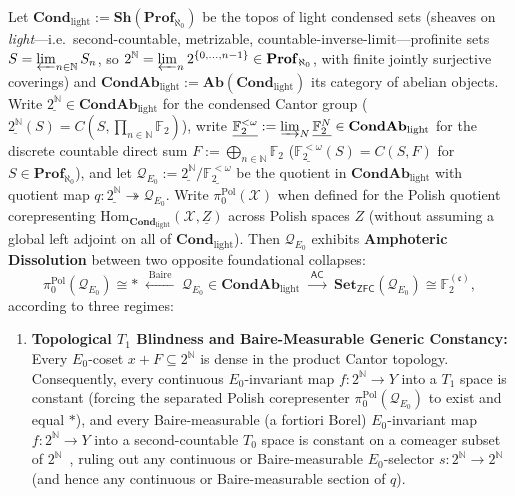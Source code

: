 \begin{theorem}\label{thm:double-solvent-r4}
%
%

Let $\mathbf{Cond}_{\mathrm{light}} := \mathbf{Sh}(\mathbf{Prof}_{\aleph_0})$ be the topos of light condensed sets (sheaves on \emph{light}---i.e.\ second-countable, metrizable, countable-inverse-limit---profinite sets $S = \varprojlim_{n \in \mathbb{N}} S_n$, so $2^{\mathbb{N}} = \varprojlim_n 2^{\{0,\dots,n-1\}} \in \mathbf{Prof}_{\aleph_0}$, with finite jointly surjective coverings) and $\mathbf{CondAb}_{\mathrm{light}} := \mathbf{Ab}(\mathbf{Cond}_{\mathrm{light}})$ its category of abelian objects. Write $\underline{2^{\mathbb{N}}} \in \mathbf{CondAb}_{\mathrm{light}}$ for the condensed Cantor group ($\underline{2^{\mathbb{N}}}(S) = C(S, \prod_{n \in \mathbb{N}} \mathbb{F}_2)$), write $\underline{\mathbb{F}_2^{<\omega}} := \varinjlim_N \underline{\mathbb{F}_2^N} \in \mathbf{CondAb}_{\mathrm{light}}$ for the discrete countable direct sum $F := \bigoplus_{n \in \mathbb{N}} \mathbb{F}_2$ ($\underline{\mathbb{F}_2^{<\omega}}(S) = C(S, F)$ for $S \in \mathbf{Prof}_{\aleph_0}$), and let $\mathcal{Q}_{E_0} := \underline{2^{\mathbb{N}}} / \underline{\mathbb{F}_2^{<\omega}}$ be the quotient in $\mathbf{CondAb}_{\mathrm{light}}$ with quotient map $q : \underline{2^{\mathbb{N}}} \twoheadrightarrow \mathcal{Q}_{E_0}$. Write $\pi_0^{\mathrm{Pol}}(\mathcal{X})$ when defined for the Polish quotient corepresenting $\mathrm{Hom}_{\mathbf{Cond}_{\mathrm{light}}}(\mathcal{X}, \underline{Z})$ across Polish spaces $Z$ (without assuming a global left adjoint on all of $\mathbf{Cond}_{\mathrm{light}}$). Then $\mathcal{Q}_{E_0}$ exhibits \textbf{Amphoteric Dissolution} between two opposite foundational collapses:
\[
  \pi_0^{\mathrm{Pol}}(\mathcal{Q}_{E_0}) \cong * \;\xleftarrow{\;\mathrm{Baire}\;}\; \mathcal{Q}_{E_0} \in \mathbf{CondAb}_{\mathrm{light}} \;\xrightarrow{\;\mathsf{AC}\;}\; \mathbf{Set}_{\mathsf{ZFC}}(\mathcal{Q}_{E_0}) \cong \mathbb{F}_2^{(\mathfrak{c})},
\]
according to three regimes:
\begin{enumerate}
  \item \textbf{Topological $T_1$ Blindness and Baire-Measurable Generic Constancy:} Every $E_0$-coset $x + F \subseteq 2^{\mathbb{N}}$ is dense in the product Cantor topology. Consequently, every continuous $E_0$-invariant map $f : 2^{\mathbb{N}} \to Y$ into a $T_1$ space is constant (forcing the separated Polish corepresenter $\pi_0^{\mathrm{Pol}}(\mathcal{Q}_{E_0})$ to exist and equal $*$), and every Baire-measurable (a fortiori Borel) $E_0$-invariant map $f : 2^{\mathbb{N}} \to Y$ into a second-countable $T_0$ space is constant on a comeager subset of $2^{\mathbb{N}}$~\cite[Theorem~8.46]{Kechris95}, ruling out any continuous or Baire-measurable $E_0$-selector $s : 2^{\mathbb{N}} \to 2^{\mathbb{N}}$ (and hence any continuous or Baire-measurable section of $q$).

\end{enumerate}
\end{theorem}
